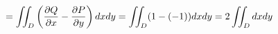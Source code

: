 \documentclass[preview]{standalone}
\begin{document}
\begin{align*}
\special{dvisvgm:raw <g id='unique000'>}= \iint_D \left( \frac{\partial Q}{\partial x} - \frac{\partial P}{\partial y} \right) dxdy = \iint_D (1 - (-1)) dxdy = 2 \iint_D dxdy\special{dvisvgm:raw </g>}
\end{align*}
\end{document}
